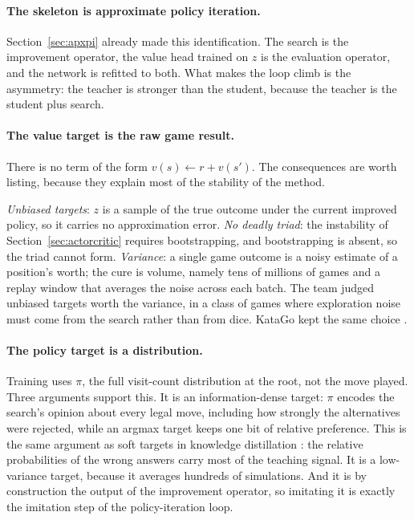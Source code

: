 \paragraph{The skeleton is approximate policy iteration.} Section~\ref{sec:apxpi}
already made this identification. The search is the improvement operator, the
value head trained on $z$ is the evaluation operator, and the network is refitted
to both. What makes the loop climb is the asymmetry: the teacher is stronger than
the student, because the teacher is the student plus search.

\paragraph{The value target is the raw game result.} There is no term of the form
$v(s) \leftarrow r + v(s')$. The consequences are worth listing, because they
explain most of the stability of the method.

\emph{Unbiased targets}: $z$ is a sample of the true outcome under the current
improved policy, so it carries no approximation error. \emph{No deadly triad}:
the instability of Section~\ref{sec:actorcritic} requires bootstrapping, and
bootstrapping is absent, so the triad cannot form. \emph{Variance}: a single game
outcome is a noisy estimate of a position's worth; the cure is volume, namely
tens of millions of games and a replay window that averages the noise across each
batch. The team judged unbiased targets worth the variance, in a class of games
where exploration noise must come from the search rather than from dice. KataGo
kept the same choice \citep{wu2019katago}.

\paragraph{The policy target is a distribution.} Training uses $\pi$, the full
visit-count distribution at the root, not the move played. Three arguments
support this. It is an information-dense target: $\pi$ encodes the search's
opinion about every legal move, including how strongly the alternatives were
rejected, while an argmax target keeps one bit of relative preference. This is
the same argument as soft targets in knowledge distillation
\citep{hinton2015distillation}: the relative probabilities of the wrong answers
carry most of the teaching signal. It is a low-variance target, because it
averages hundreds of simulations. And it is by construction the output of the
improvement operator, so imitating it is exactly the imitation step of the
policy-iteration loop.

